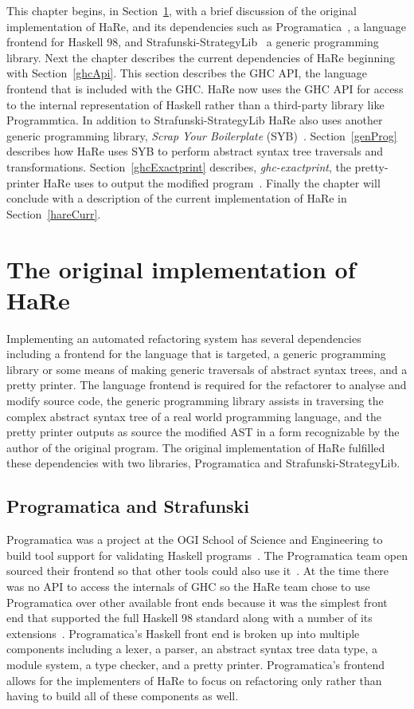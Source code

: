 This chapter begins, in Section~\ref{hareOrig}, with a brief discussion of the original implementation of HaRe, and its dependencies such as Programatica~\citep{programatica}, a language frontend for Haskell 98, and Strafunski-StrategyLib~\citep{strafunski} a generic programming library. Next the chapter describes the current dependencies of HaRe beginning with Section~\ref{ghcApi}. This section describes the GHC API, the language frontend that is included with the GHC. HaRe now uses the GHC API for access to the internal representation of Haskell rather than a third-party library like Programmtica. In addition to Strafunski-StrategyLib HaRe also uses another generic programming library, \textit{Scrap Your Boilerplate} (SYB)~\citep{syb}. Section~\ref{genProg} describes how HaRe uses SYB to perform abstract syntax tree traversals and transformations. Section~\ref{ghcExactprint} describes, \textit{ghc-exactprint}, the pretty-printer HaRe uses to output the modified program~\citep{exactprint}. Finally the chapter will conclude with a description of the current implementation of HaRe in Section~\ref{hareCurr}.

\section{The original implementation of HaRe}
\label{hareOrig}

Implementing an automated refactoring system has several dependencies including a frontend for the language that is targeted, a generic programming library or some means of making generic traversals of abstract syntax trees, and a pretty printer. The language frontend is required for the refactorer to analyse and modify source code, the generic programming library assists in traversing the complex abstract syntax tree of a real world programming language, and the pretty printer outputs as source the modified AST in a form recognizable by the author of the original program. The original implementation of HaRe fulfilled these dependencies with two libraries, Programatica and Strafunski-StrategyLib. 

\subsection{Programatica and Strafunski}\label{prog&Strafunski}

Programatica was a project at the OGI School of Science and Engineering to build tool support for validating Haskell programs~\citep{programaticaTools}. The Programatica team open sourced their frontend so that other tools could also use it~\citep{refacWebsite}. At the time there was no API to access the internals of GHC so the HaRe team chose to use Programatica over other available front ends because it was the simplest front end that supported the full Haskell 98 standard along with a number of its extensions~\citep{huiqingThesis}. Programatica's Haskell front end is broken up into multiple components including a lexer, a parser, an abstract syntax tree data type, a module system, a type checker, and a pretty printer. Programatica's frontend allows for the implementers of HaRe to focus on refactoring only rather than having to build all of these components as well.

